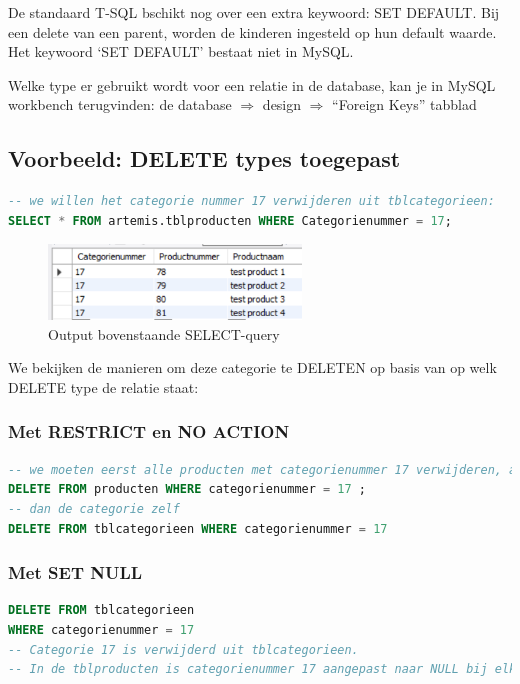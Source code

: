 \documentclass{article}
\begin{document}
De standaard T-SQL bschikt nog over een extra keywoord: SET DEFAULT. 
Bij een delete van een parent, worden de kinderen ingesteld op hun default waarde. 
Het keywoord ‘SET DEFAULT’ bestaat niet in MySQL.

Welke type er gebruikt wordt voor een relatie in de database, kan je in MySQL workbench terugvinden:
de database $\Rightarrow$ design $\Rightarrow$ “Foreign Keys” tabblad

\subsection{Voorbeeld: DELETE types toegepast}
\begin{lstlisting}[language=SQL]
-- we willen het categorie nummer 17 verwijderen uit tblcategorieen:
SELECT * FROM artemis.tblproducten WHERE Categorienummer = 17;
\end{lstlisting}

\begin{figure}[H]
    \centering
    \includegraphics[width=0.6\textwidth]{7-3.png}
    \caption{Output bovenstaande SELECT-query}
\end{figure}

We bekijken de manieren om deze categorie te DELETEN op basis van op welk DELETE type de relatie staat:

\subsubsection{Met RESTRICT en NO ACTION}
\begin{lstlisting}[language=SQL]
-- we moeten eerst alle producten met categorienummer 17 verwijderen, anders krijgen we een error:
DELETE FROM producten WHERE categorienummer = 17 ;
-- dan de categorie zelf
DELETE FROM tblcategorieen WHERE categorienummer = 17
\end{lstlisting}

\subsubsection{Met SET NULL}
\begin{lstlisting}[language=SQL]
DELETE FROM tblcategorieen
WHERE categorienummer = 17
-- Categorie 17 is verwijderd uit tblcategorieen. 
-- In de tblproducten is categorienummer 17 aangepast naar NULL bij elk product van categorie 17.
\end{lstlisting}
\end{document}
